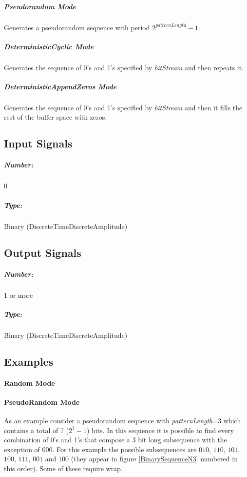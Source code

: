 \subparagraph*{Pseudorandom Mode}
Generates a pseudorandom sequence with period $2^\textit{patternLength}-1$.

\subparagraph*{DeterministicCyclic Mode}
Generates the sequence of 0's and 1's specified by \textit{bitStream} and then repeats it.

\subparagraph*{DeterministicAppendZeros Mode}
Generates the sequence of 0's and 1's specified by \textit{bitStream} and then it fills the rest of the buffer space with zeros.

\subsection*{Input Signals}


\subparagraph*{Number:} 0

\subparagraph*{Type:} Binary (DiscreteTimeDiscreteAmplitude)

\subsection*{Output Signals}

\subparagraph*{Number:} 1 or more

\subparagraph*{Type:} Binary (DiscreteTimeDiscreteAmplitude)

\subsection*{Examples}

\paragraph*{Random Mode}

\paragraph*{PseudoRandom Mode}
As an example consider a pseudorandom sequence with \textit{patternLength}=3 which contains a total of 7 ($2^3-1$) bits. In this sequence it is possible to find every combination of 0's and 1's that compose a 3 bit long subsequence with the exception of $000$. For this example the possible subsequences are $010$, $110$, $101$, $100$, $111$, $001$ and $100$ (they appear in figure \ref{BinarySequenceN3} numbered in this order). Some of these require wrap.

